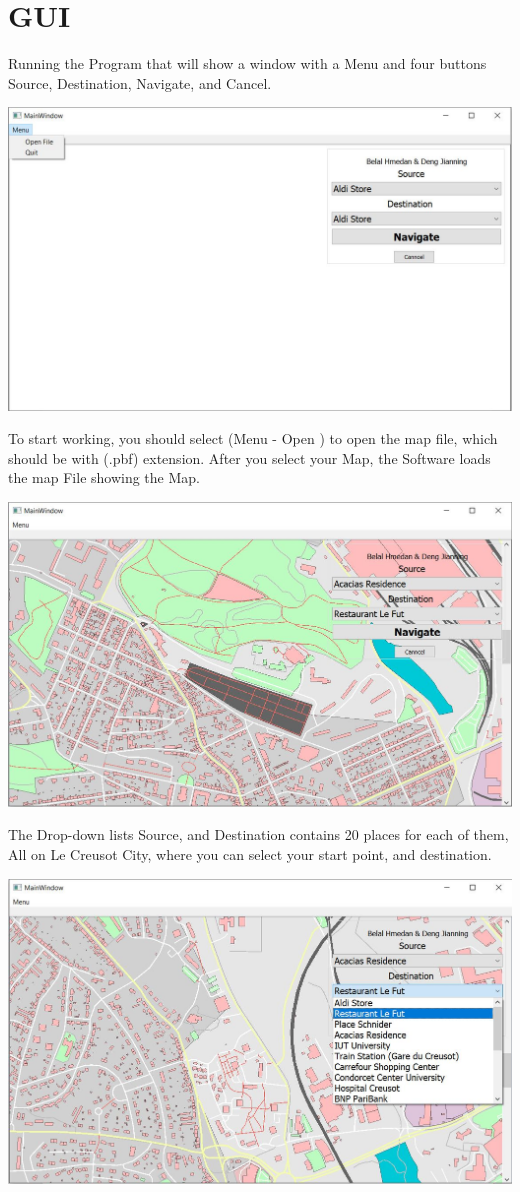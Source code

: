 \documentclass[a4paper,english]{book}
\begin{document}
\section{GUI}
Running the Program that will show a window with a Menu and four buttons Source, Destination, Navigate, and Cancel.
\begin{center}
\includegraphics[width=.6\textwidth]{GUI_NoMap.JPG}
\end{center}
To start working, you should select (Menu - Open )
to open the map file, which should be with (.pbf) extension.
After you select your Map, the Software loads the map File showing the Map.
\begin{center}
\includegraphics[width=.6\textwidth]{GUI_Map0.JPG}
\end{center}
The Drop-down lists Source, and Destination contains 20 places for each of them, All on Le Creusot City, where you can select your start point, and destination.
\begin{center}
\includegraphics[width=.6\textwidth]{GUI_Map1.JPG}
\end{center}
\end{document}
